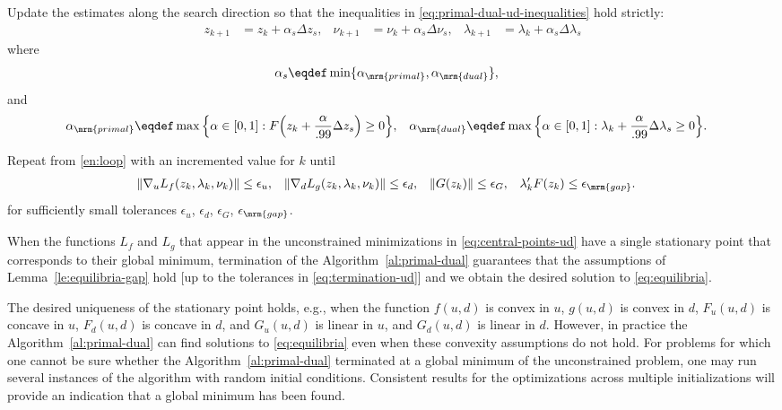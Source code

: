 \documentclass[11pt]{article}
\begin{document}
\begin{algorithm}
\begin{steps}
\item Update the estimates along the search direction so that the
  inequalities in \eqref{eq:primal-dual-ud-inequalities} hold strictly:
  \begin{align*}
    z_{k+1}&=z_k+\alpha_s\Delta z_s, &
    \nu_{k+1}&=\nu_k+\alpha_s \Delta \nu_s, &
    \lambda_{k+1}&=\lambda_k+\alpha_s \Delta \lambda_s
  \end{align*}
  where
  \begin{align*}
    \alpha_s&\eqdef\min\{\alpha_\mrm{primal},\alpha_\mrm{dual}\}, 
  \end{align*}
  and
  \begin{align}
    \alpha_\mrm{primal}&\eqdef \max\Big\{\alpha\in[0,1]:F\Big(z_k+\frac{\alpha}{.99} \Delta z_s\Big)\ge 0\Big\}, &
    \alpha_\mrm{dual}&\eqdef \max\Big\{\alpha\in[0,1]:\lambda_k+\frac{\alpha}{.99} \Delta\lambda_s\ge 0 \Big\}.
  \end{align}

\item Repeat from \ref{en:loop} with an incremented value for $k$ until
  \begin{align}\label{eq:termination-ud}
    \|\nabla_u L_f(z_k,\lambda_k,\nu_k)\|&\le \epsilon_u, &
    \|\nabla_d L_g(z_k,\lambda_k,\nu_k)\|&\le \epsilon_d, &
    \|G(z_k)\|&\le \epsilon_G, &
    \lambda_k 'F(z_k)&\le \epsilon_\mrm{gap}.
  \end{align}
  for sufficiently small tolerances $\epsilon_u$, $\epsilon_d$, $\epsilon_G$,
  $\epsilon_\mrm{gap}$. \frqed
\end{steps}
\end{algorithm}

When the functions $L_f$ and $L_g$ that appear in the unconstrained
minimizations in \eqref{eq:central-points-ud} have a single stationary
point that corresponds to their global minimum, termination of the
Algorithm~\ref{al:primal-dual} guarantees that the assumptions of
Lemma~\ref{le:equilibria-gap} hold [up to the tolerances in
\eqref{eq:termination-ud}] and we obtain the desired solution to
\eqref{eq:equilibria}.

\medskip

The desired uniqueness of the stationary point holds, e.g., when the
function $f(u,d)$ is convex in $u$, $g(u,d)$ is convex in $d$,
$F_u(u,d)$ is concave in $u$, $F_d(u,d)$ is concave in $d$, and
$G_u(u,d)$ is linear in $u$, and $G_d(u,d)$ is linear in $d$. However,
in practice the Algorithm~\ref{al:primal-dual} can find solutions to
\eqref{eq:equilibria} even when these convexity assumptions do not
hold. For problems for which one cannot be sure whether the
Algorithm~\ref{al:primal-dual} terminated at a global minimum of the
unconstrained problem, one may run several instances of the algorithm with
random initial conditions. Consistent results for the optimizations
across multiple initializations will provide an indication that a global
minimum has been found.
\end{document}
